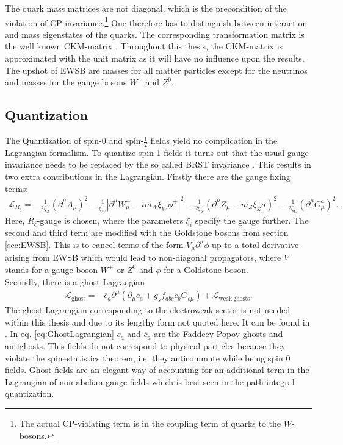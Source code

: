 The quark mass matrices are not diagonal, which is the precondition of the violation of CP invariance.\footnote{The actual CP-violating term is in the coupling term of quarks to the $W$-bosons.} One therefore has to distinguish between interaction and mass eigenstates of the quarks. The corresponding transformation matrix is the well known CKM-matrix \cite{Cabbibo:1964zsa, Kobayashi:1973fv}. Throughout this thesis, the CKM-matrix is approximated with the unit matrix as it will have no influence upon the results.\\
The upshot of EWSB are masses for all matter particles except for the neutrinos and masses for the gauge bosons $W^\pm$ and $Z^0$.

\subsection{Quantization}
The Quantization of spin-0 and spin-$\frac{1}{2}$ fields yield no complication in the Lagrangian formalism. To quantize spin 1 fields it turns out that the usual gauge invariance needs to be replaced by the so called BRST invariance \cite{Becchi:1974xu, Becchi:1974md, Becchi:1975nq}. This results in two extra contributions in the Lagrangian. Firstly there are the gauge fixing terms:
\begin{align}
\mathcal{L}_{R_\xi} = -\frac{1}{2\xi_A} (\partial^\mu A_\mu)^2  - \frac{1}{\xi_W} |\partial^\mu W_\mu^+ - im_W \xi_W \phi^+|^2 - \frac{1}{2\xi_Z} (\partial^\mu Z_\mu - m_Z \xi_Z \sigma)^2 - \frac{1}{2\xi_G}(\partial^\mu G_\mu^a)^2.
\end{align}
Here, $R_\xi$-gauge is chosen, where the parameters $\xi_i$ specify the gauge further. The second and third term are modified with the Goldstone bosons from section \ref{sec:EWSB}. This is to cancel terms of the form $V_\mu \partial^\mu \phi$ up to a total derivative arising from EWSB which would lead to non-diagonal propagators, where $V$ stands for a gauge boson $W^\pm$ or $Z^0$ and $\phi$ for a Goldstone boson.\\%
Secondly, there is a ghost Lagrangian
\begin{align}
\mathcal{L}_{\mathrm{ghost}} = -\overline{c}_a \partial^\mu \left( \partial_\mu c_a + g_s f_{abc} c_b G_{c \mu} \right) + \mathcal{L}_{\mathrm{weak\ ghosts}}.\label{eq:GhostLagrangian}
\end{align}
The ghost Lagrangian corresponding to the electroweak sector is not needed within this thesis and due to its lengthy form not quoted here. It can be found in \cite{book:811554}. %
In eq. \eqref{eq:GhostLagrangian} $c_a$ and $\overline{c}_a$ are the Faddeev-Popov ghosts and antighosts. This fields do not correspond to physical particles because they violate the spin–statistics theorem, i.e. they anticommute while being spin 0 fields. Ghost fields are an elegant way of accounting for an additional term in the Lagrangian of non-abelian gauge fields which is best seen in the path integral quantization\cite{Peskin}.

